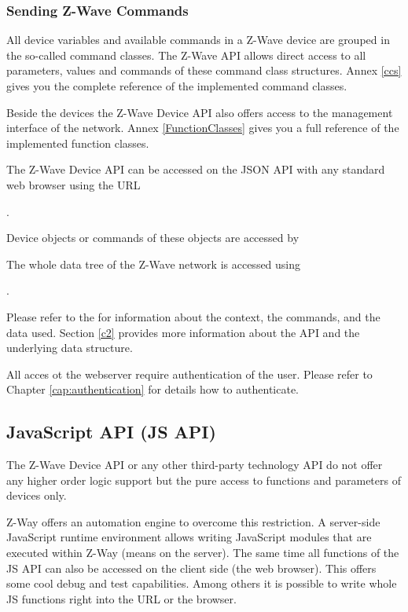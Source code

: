\subsubsection {Sending Z-Wave Commands}

All device variables and available commands in a Z-Wave device are grouped in the so-called 
command classes. The Z-Wave API allows direct access to all parameters, values and commands 
of these command class structures. Annex \ref{ccs} gives you the complete reference of 
the implemented command classes.

Beside the devices the Z-Wave Device API also offers access to the management interface of 
the network. Annex \ref{FunctionClasses} gives you a full reference of the implemented 
function classes.

The Z-Wave Device API can be accessed on the JSON API with any standard web browser using the URL

.

Device objects or commands of these objects are accessed by




The whole data tree of the Z-Wave network is accessed using


.

Please refer to the \zway for information about the context, the 
commands, and the data used. Section \ref{c2} provides more information
about the API and the underlying data structure.

All acces ot the webserver require authentication of the user. Please refer to Chapter 
\ref{cap:authentication} for details how to authenticate.

\subsection{JavaScript API (JS API)}

The Z-Wave Device API or any other third-party technology API do not offer any higher order
logic support but the pure access to functions and parameters of devices only.

Z-Way offers an automation engine to overcome this restriction. A server-side JavaScript 
runtime environment allows writing JavaScript modules that are executed within Z-Way 
(means on the server). The same time all functions of the JS API can also be accessed on 
the client side (the web browser). This offers some cool debug and test capabilities. 
Among others it is possible to write whole JS functions right into the URL or the browser.

